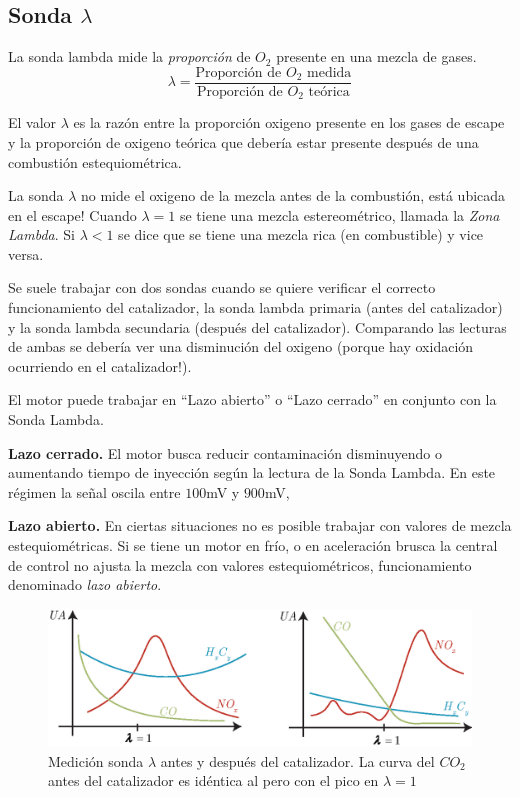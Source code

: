 \subsection[Sonda Lambda]{Sonda $\lambda$}
La sonda lambda mide la \textit{proporción} de $O_2$ presente en una mezcla de gases.
\[
\lambda = \frac{\textrm{Proporción de $O_2$ medida}}{\textrm{Proporción de $O_2$ teórica}}
\]

El valor $\lambda$ es la razón entre la proporción oxigeno presente en los gases de escape y la proporción de oxigeno teórica que debería estar presente después de una combustión estequiométrica.

{\color{magenta}La sonda $\lambda$ no mide el oxigeno de la mezcla antes de la combustión, está ubicada en el escape!} Cuando $\lambda =1$ se tiene una mezcla estereométrico, llamada la \emph{Zona Lambda}. Si $\lambda<1$ se dice que se tiene una mezcla rica (en combustible) y vice versa. 

Se suele trabajar con dos sondas cuando se quiere verificar el correcto funcionamiento del catalizador, la sonda lambda primaria (antes del catalizador) y la sonda lambda secundaria (después del catalizador). Comparando las lecturas de ambas se debería ver una disminución del oxigeno (porque hay oxidación ocurriendo en el catalizador!).

El motor puede trabajar en ``Lazo abierto'' o ``Lazo cerrado'' en conjunto con la Sonda Lambda. 

{\bf Lazo cerrado.} El motor busca reducir contaminación disminuyendo o aumentando tiempo de inyección según la lectura de la Sonda Lambda. En este régimen la señal oscila entre $100$mV y $900$mV,

{\bf Lazo abierto.} En ciertas situaciones no es posible trabajar con valores de mezcla estequiométricas. Si se tiene un motor en frío, o en aceleración brusca la central de control no ajusta la mezcla con valores estequiométricos, funcionamiento denominado \emph{lazo abierto}.

\begin{figure}[!htb]
    \centering
    \includegraphics[width=.47\textwidth]{fig/lambdaEscape.eps}
    \caption{Medición sonda $\lambda$ antes y después del catalizador. La curva del $CO_2$ antes del catalizador es idéntica al \NX{} pero con el pico en $\lambda=1$}
    \label{fig:lambdaCatalizador}
\end{figure}

